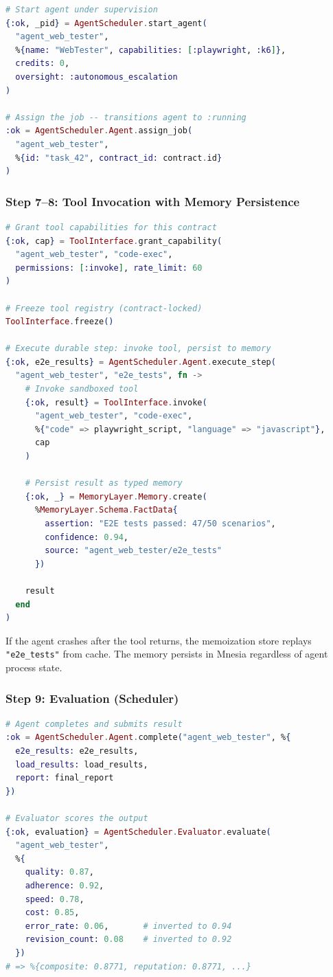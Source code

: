 \documentclass[12pt,a4paper]{article}
\theoremstyle{definition}
\begin{document}
\begin{lstlisting}[language=elixir, caption={Scheduler assigns agent to job}]
# Start agent under supervision
{:ok, _pid} = AgentScheduler.start_agent(
  "agent_web_tester",
  %{name: "WebTester", capabilities: [:playwright, :k6]},
  credits: 0,
  oversight: :autonomous_escalation
)

# Assign the job -- transitions agent to :running
:ok = AgentScheduler.Agent.assign_job(
  "agent_web_tester",
  %{id: "task_42", contract_id: contract.id}
)
\end{lstlisting}

\subsubsection{Step 7--8: Tool Invocation with Memory Persistence}

\begin{lstlisting}[language=elixir, caption={Agent executes steps with tools and memory}]
# Grant tool capabilities for this contract
{:ok, cap} = ToolInterface.grant_capability(
  "agent_web_tester", "code-exec",
  permissions: [:invoke], rate_limit: 60
)

# Freeze tool registry (contract-locked)
ToolInterface.freeze()

# Execute durable step: invoke tool, persist to memory
{:ok, e2e_results} = AgentScheduler.Agent.execute_step(
  "agent_web_tester", "e2e_tests", fn ->
    # Invoke sandboxed tool
    {:ok, result} = ToolInterface.invoke(
      "agent_web_tester", "code-exec",
      %{"code" => playwright_script, "language" => "javascript"},
      cap
    )

    # Persist result as typed memory
    {:ok, _} = MemoryLayer.Memory.create(
      %MemoryLayer.Schema.FactData{
        assertion: "E2E tests passed: 47/50 scenarios",
        confidence: 0.94,
        source: "agent_web_tester/e2e_tests"
      })

    result
  end
)
\end{lstlisting}

If the agent crashes after the tool returns, the memoization store replays
\texttt{"e2e\_tests"} from cache. The memory persists in Mnesia regardless
of agent process state.

\subsubsection{Step 9: Evaluation (Scheduler)}

\begin{lstlisting}[language=elixir, caption={6-dimensional evaluation}]
# Agent completes and submits result
:ok = AgentScheduler.Agent.complete("agent_web_tester", %{
  e2e_results: e2e_results,
  load_results: load_results,
  report: final_report
})

# Evaluator scores the output
{:ok, evaluation} = AgentScheduler.Evaluator.evaluate(
  "agent_web_tester",
  %{
    quality: 0.87,
    adherence: 0.92,
    speed: 0.78,
    cost: 0.85,
    error_rate: 0.06,       # inverted to 0.94
    revision_count: 0.08    # inverted to 0.92
  })
# => %{composite: 0.8771, reputation: 0.8771, ...}
\end{lstlisting}
\end{document}
